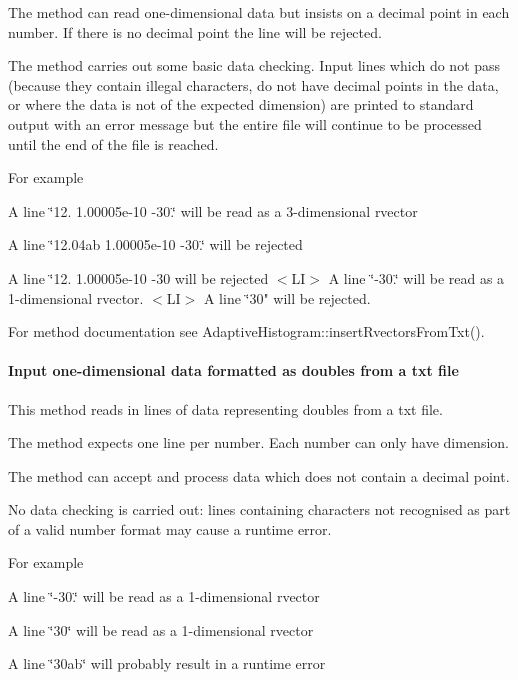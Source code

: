 \-The method can read one-\/dimensional data but insists on a decimal point in each number. \-If there is no decimal point the line will be rejected.

\-The method carries out some basic data checking. \-Input lines which do not pass (because they contain illegal characters, do not have decimal points in the data, or where the data is not of the expected dimension) are printed to standard output with an error message but the entire file will continue to be processed until the end of the file is reached.

\-For example 
\begin{DoxyItemize}
\item \-A line \char`\"{}12. 1.\-00005e-\/10 -\/30.\char`\"{} will be read as a 3-\/dimensional rvector 
\item \-A line \char`\"{}12.\-04ab 1.\-00005e-\/10 -\/30.\char`\"{} will be rejected 
\item \-A line \char`\"{}12. 1.\-00005e-\/10 -\/30 will be rejected
$<$\-L\-I$>$ A line \char`\"{}-\/30.\char`\"{} will be read as a 1-\/dimensional rvector.
$<$\-L\-I$>$ A line \char`\"{}30" will be rejected. 
\end{DoxyItemize}

\-For method documentation see \-Adaptive\-Histogram\-::insert\-Rvectors\-From\-Txt().\hypertarget{AdaptiveHistograms_adhsubsubsec_inputdoubles}{}\paragraph{\-Input one-\/dimensional data formatted as doubles from a txt file}\label{AdaptiveHistograms_adhsubsubsec_inputdoubles}
\-This method reads in lines of data representing doubles from a txt file.

\-The method expects one line per number. \-Each number can only have dimension.

\-The method can accept and process data which does not contain a decimal point.

\-No data checking is carried out\-: lines containing characters not recognised as part of a valid number format may cause a runtime error.

\-For example 
\begin{DoxyItemize}
\item \-A line \char`\"{}-\/30.\char`\"{} will be read as a 1-\/dimensional rvector 
\item \-A line \char`\"{}30\char`\"{} will be read as a 1-\/dimensional rvector 
\item \-A line \char`\"{}30ab\char`\"{} will probably result in a runtime error 
\end{DoxyItemize}

